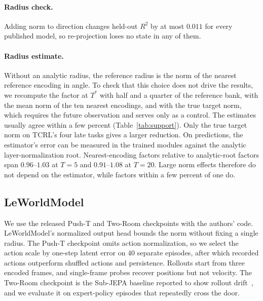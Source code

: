 \paragraph{Radius check.} Adding norm to direction changes held-out $R^2$ by at most $0.011$ for every published model, so re-projection loses no state in any of them.

\paragraph{Radius estimate.} Without an analytic radius, the reference radius is the norm of the nearest reference encoding in angle. To check that this choice does not drive the results, we recompute the factor at $T^*$ with half and a quarter of the reference bank, with the mean norm of the ten nearest encodings, and with the true target norm, which requires the future observation and serves only as a control. The estimates usually agree within a few percent (Table~\ref{tab:support}). Only the true target norm on TCRL's four late tasks gives a larger reduction. On predictions, the estimator's error can be measured in the trained modules against the analytic layer-normalization root. Nearest-encoding factors relative to analytic-root factors span $0.96$--$1.03$ at $T=5$ and $0.91$--$1.08$ at $T=20$. Large norm effects therefore do not depend on the estimator, while factors within a few percent of one do.









\subsection{LeWorldModel}
\label{app:lewm}
We use the released Push-T and Two-Room checkpoints with the authors' code. LeWorldModel's normalized output head bounds the norm without fixing a single radius. The Push-T checkpoint omits action normalization, so we select the action scale by one-step latent error on $40$ separate episodes, after which recorded actions outperform shuffled actions and persistence. Rollouts start from three encoded frames, and single-frame probes recover positions but not velocity. The Two-Room checkpoint is the Sub-JEPA baseline reported to show rollout drift~\citep{zhao2026subjepa}, and we evaluate it on expert-policy episodes that repeatedly cross the door.

